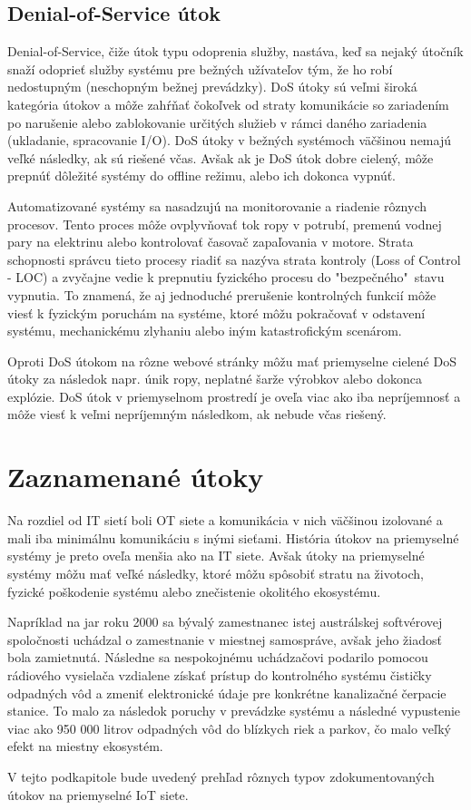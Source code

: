 \subsection{Denial-of-Service útok}
\tab Denial-of-Service, čiže útok typu odoprenia služby, nastáva, keď sa nejaký útočník snaží odoprieť služby systému pre bežných užívateľov tým, že ho robí nedostupným (neschopným bežnej prevádzky). DoS útoky sú veľmi široká kategória útokov a môže zahŕňať čokoľvek od straty komunikácie so zariadením po narušenie alebo zablokovanie určitých služieb v rámci daného zariadenia (ukladanie, spracovanie I/O). DoS útoky v bežných systémoch väčšinou nemajú veľké následky, ak sú riešené včas. Avšak ak je DoS útok dobre cielený, môže prepnúť dôležité systémy do offline režimu, alebo ich dokonca vypnúť. \par
Automatizované systémy sa nasadzujú na monitorovanie a riadenie rôznych procesov. Tento proces môže ovplyvňovať tok ropy v potrubí, premenú vodnej pary na elektrinu alebo kontrolovať časovač zapaľovania v motore. Strata schopnosti správcu tieto procesy riadiť sa nazýva strata kontroly (Loss of Control - LOC) a zvyčajne vedie k prepnutiu fyzického procesu do "bezpečného"\ stavu vypnutia. To znamená, že aj jednoduché prerušenie kontrolných funkcií môže viesť k fyzickým poruchám na systéme, ktoré môžu pokračovať v odstavení systému, mechanickému zlyhaniu alebo iným katastrofickým scenárom. \par
Oproti DoS útokom na rôzne webové stránky môžu mať priemyselne cielené DoS útoky za následok napr. únik ropy, neplatné šarže výrobkov alebo dokonca explózie. DoS útok v priemyselnom prostredí je oveľa viac ako iba nepríjemnosť a môže viesť k veľmi nepríjemným následkom, ak nebude včas riešený\cite{Security}.

\section{Zaznamenané útoky}
\tab Na rozdiel od IT sietí boli OT siete a komunikácia v nich väčšinou izolované a mali iba minimálnu komunikáciu s inými sieťami. História útokov na priemyselné systémy je preto oveľa menšia ako na IT siete. Avšak útoky na priemyselné systémy môžu mať veľké následky, ktoré môžu spôsobiť stratu na životoch, fyzické poškodenie systému alebo znečistenie okolitého ekosystému. \par
Napríklad na jar roku 2000 sa bývalý zamestnanec istej austrálskej softvérovej spoločnosti uchádzal o zamestnanie v miestnej samospráve, avšak jeho žiadosť bola zamietnutá. Následne sa nespokojnému uchádzačovi podarilo pomocou rádiového vysielača vzdialene získať prístup do kontrolného systému čističky odpadných vôd a zmeniť elektronické údaje pre konkrétne kanalizačné čerpacie stanice. To malo za následok poruchy v prevádzke systému a následné vypustenie viac ako 950 000 litrov odpadných vôd do blízkych riek a parkov, čo malo veľký efekt na miestny ekosystém\cite[p.~3-20]{nist}. \par
V tejto podkapitole bude uvedený prehľad rôznych typov zdokumentovaných útokov na priemyselné IoT siete. 

